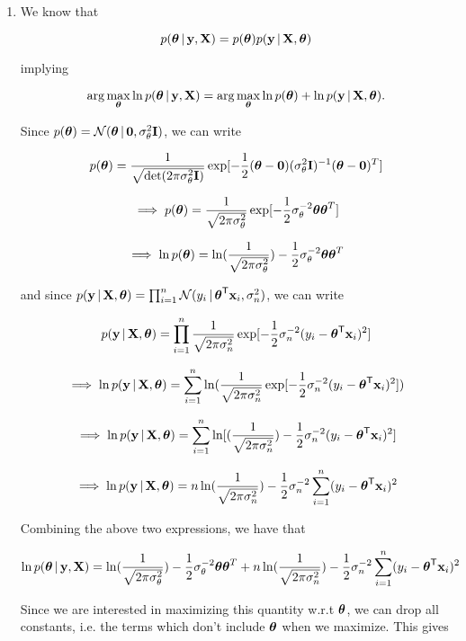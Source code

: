 \documentclass[submit]{harvardml}
\begin{document}
\begin{enumerate}
\item We know that 

$$ p(\boldsymbol{\theta} \,|\, \mathbf{y}, \mathbf{X})= p(\boldsymbol{\theta}) p(\mathbf{y} \,|\, \mathbf{X}, \boldsymbol{\theta}) $$

implying 

\[\arg\max_{\boldsymbol{\theta}} \ln p(\boldsymbol{\theta} \,|\, \mathbf{y}, \mathbf{X})= \arg\max_{\boldsymbol{\theta}} \ln p(\boldsymbol{\theta}) + \ln p(\mathbf{y} \,|\, \mathbf{X}, \boldsymbol{\theta}).\]

Since $p(\boldsymbol{\theta}) = \mathcal{N}(\boldsymbol{\theta} \,|\, \bold0, \sigma^2_\theta\mathbf{I} )$, we can write

$$ p(\boldsymbol{\theta}) = \frac{1}{\sqrt{\det(2\pi\sigma^2_\theta\mathbf{I})}}\exp[{-\frac{1}{2}(\boldsymbol{\theta}-\bold0)(\sigma^2_\theta\mathbf{I})^{-1}(\boldsymbol{\theta}-\bold0)^T}]$$

$$ \implies p(\boldsymbol{\theta}) = \frac{1}{\sqrt{2\pi\sigma^2_\theta}}\exp[{-\frac{1}{2}\sigma^{-2}_\theta\boldsymbol{\theta}\boldsymbol{\theta}^T}]$$

$$ \implies \ln p(\boldsymbol{\theta}) = \ln(\frac{1}{\sqrt{2\pi\sigma^2_\theta}}) - \frac{1}{2}\sigma^{-2}_\theta\boldsymbol{\theta}\boldsymbol{\theta}^T$$

and since $p(\mathbf{y} \,|\, \mathbf{X}, \boldsymbol{\theta}) = \prod_{i=1}^n \mathcal{N}(y_i \,|\, \boldsymbol{\theta}^{\mathsf{T}} \mathbf{x}_i, \sigma^2_n)$, we can write

$$p(\mathbf{y} \,|\, \mathbf{X}, \boldsymbol{\theta}) = \prod_{i=1}^n \frac{1}{\sqrt{2\pi\sigma^2_n}}\exp[-\frac{1}{2}\sigma^{-2}_n(y_i-\boldsymbol{\theta}^{\mathsf{T}} \mathbf{x}_i)^2]$$

$$\implies \ln p(\mathbf{y} \,|\, \mathbf{X}, \boldsymbol{\theta}) = \sum_{i=1}^n \ln( \frac{1}{\sqrt{2\pi\sigma^2_n}}\exp[-\frac{1}{2}\sigma^{-2}_n(y_i-\boldsymbol{\theta}^{\mathsf{T}} \mathbf{x}_i)^2])$$

$$\implies \ln p(\mathbf{y} \,|\, \mathbf{X}, \boldsymbol{\theta}) = \sum_{i=1}^n \ln[( \frac{1}{\sqrt{2\pi\sigma^2_n}})-\frac{1}{2}\sigma^{-2}_n(y_i-\boldsymbol{\theta}^{\mathsf{T}} \mathbf{x}_i)^2]$$

$$\implies \ln p(\mathbf{y} \,|\, \mathbf{X}, \boldsymbol{\theta}) =  n\ln( \frac{1}{\sqrt{2\pi\sigma^2_n}}) -\frac{1}{2}\sigma^{-2}_n \sum_{i=1}^n(y_i-\boldsymbol{\theta}^{\mathsf{T}} \mathbf{x}_i)^2 $$

Combining the above two expressions, we have that 

$$ \ln p(\boldsymbol{\theta} \,|\, \mathbf{y}, \mathbf{X})=  \ln(\frac{1}{\sqrt{2\pi\sigma^2_\theta}}) - \frac{1}{2}\sigma^{-2}_\theta\boldsymbol{\theta}\boldsymbol{\theta}^T + n\ln( \frac{1}{\sqrt{2\pi\sigma^2_n}}) -\frac{1}{2}\sigma^{-2}_n \sum_{i=1}^n(y_i-\boldsymbol{\theta}^{\mathsf{T}} \mathbf{x}_i)^2 $$

Since we are interested in maximizing this quantity w.r.t $\boldsymbol{\theta}$, we can drop all constants, i.e. the terms which don't include $\boldsymbol{\theta}$ when we maximize. This gives


\end{enumerate}
\end{document}
